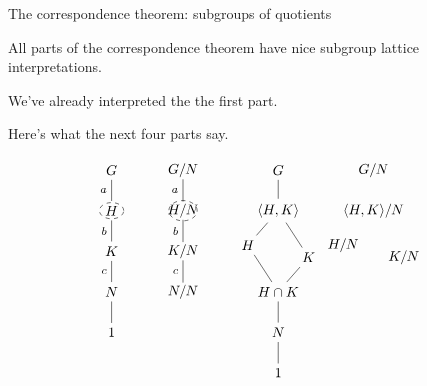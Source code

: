 \documentclass[8pt]{beamer}
\newcommand{\Pause}{}      %
\begin{document}
\begin{frame}{The correspondence theorem: subgroups of quotients} 
  
  All parts of the correspondence theorem have nice subgroup lattice
  interpretations. \medskip\Pause
  
  We've already interpreted the the first part. \medskip\Pause
  
  Here's what the next four parts say.

  \[
  \begin{tikzpicture}[scale=.6]
    \begin{scope}[shift={(0,0)},scale=1.7]
      \node (G) at (0,4) {$G$};
      \node (H) at (0,3) {$H$};
      \node (K) at (0,2) {$K$};
      \node (N) at (0,1) {$N$};
      \node (1) at (0,0) {$1$};
      \draw[dashed] (H) circle [x radius=.3cm, y radius=.2cm];
      \draw (G) -- (H) node[left,pos=.5] {\footnotesize $a$}; 
      \draw (H) -- (K) node[left,pos=.5] {\footnotesize $b$};
      \draw (K) -- (N) node[left,pos=.5] {\footnotesize $c$};  
      \draw (N) to (1);
    \end{scope}
    \begin{scope}[shift={(3,0)},scale=1.7,shorten >= -2pt, shorten <= -2pt]
      \node (G/N) at (0,4) {$G/N$};
      \node (H/N) at (0,3) {$H/N$};
      \node (K/N) at (0,2) {$K/N$};
      \node (N/N) at (0,1) {$N/N$};
      \draw[dashed] (H/N) circle [x radius=.35cm, y radius=.25cm];
      \draw (G/N) -- (H/N) node[left,pos=.5] {\footnotesize $a$}; 
      \draw (H/N) -- (K/N) node[left,pos=.5] {\footnotesize $b$};
      \draw (K/N) -- (N/N) node[left,pos=.5] {\footnotesize $c$}; 
    \end{scope}
    \begin{scope}[shift={(7,0)},scale=1.7]
      \node (G) at (0,4) {$G$};
      \node (HcupK) at (0,3) {$\<H,K\>$};
      \node (H) at (-.75,2.15) {$H$};
      \node (K) at (.75,1.85) {$K$};
      \node (HcapK) at (0,1) {$H\cap K$};
      \node (N) at (0,0) {$N$};
      \node (1) at (0,-1) {$1$};
      \draw (G) -- (HcupK);
      \draw (HcupK) -- (H); \draw (HcupK) -- (K);
      \draw (HcapK) -- (H); \draw (HcapK) -- (K);
      \draw (HcapK) -- (N);
      \draw (N) -- (1);
    \end{scope}
    \begin{scope}[shift={(11,0)},scale=1.7]
      \node (G/N) at (0,4) {$G/N$};
      \node (HcupK/N) at (0,3) {$\<H,K\>/N$};
      \node (H/N) at (-.75,2.15) {$H/N$};
      \node (K/N) at (.75,1.85) {$K/N$};

\end{scope}
\end{tikzpicture}\]
\end{frame}
\end{document}
